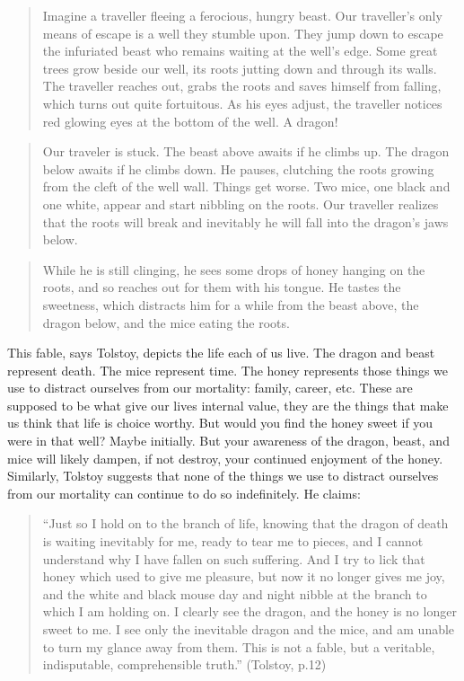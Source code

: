 \documentclass[9pt]{article}
\begin{document}
\begin{quote}
Imagine a traveller fleeing a ferocious, hungry beast. Our traveller's
only means of escape is a well they stumble upon. They jump down to
escape the infuriated beast who remains waiting at the well's edge. Some
great trees grow beside our well, its roots jutting down and through its
walls. The traveller reaches out, grabs the roots and saves himself from
falling, which turns out quite fortuitous. As his eyes adjust, the
traveller notices red glowing eyes at the bottom of the well. A dragon!
\end{quote}

\begin{quote}
Our traveler is stuck. The beast above awaits if he climbs up. The
dragon below awaits if he climbs down. He pauses, clutching the roots
growing from the cleft of the well wall. Things get worse. Two mice, one
black and one white, appear and start nibbling on the roots. Our
traveller realizes that the roots will break and inevitably he will fall
into the dragon's jaws below.
\end{quote}

\begin{quote}
While he is still clinging, he sees some drops of honey hanging on the
roots, and so reaches out for them with his tongue. He tastes the
sweetness, which distracts him for a while from the beast above, the
dragon below, and the mice eating the roots.
\end{quote}

This fable, says Tolstoy, depicts the life each of us live. The dragon
and beast represent death. The mice represent time. The honey represents
those things we use to distract ourselves from our mortality: family,
career, etc. These are supposed to be what give our lives internal
value, they are the things that make us think that life is choice
worthy. But would you find the honey sweet if you were in that well?
Maybe initially. But your awareness of the dragon, beast, and mice will
likely dampen, if not destroy, your continued enjoyment of the honey.
Similarly, Tolstoy suggests that none of the things we use to distract
ourselves from our mortality can continue to do so indefinitely. He
claims:

\begin{quote}
``Just so I hold on to the branch of life, knowing that the dragon of
death is waiting inevitably for me, ready to tear me to pieces, and I
cannot understand why I have fallen on such suffering. And I try to lick
that honey which used to give me pleasure, but now it no longer gives me
joy, and the white and black mouse day and night nibble at the branch to
which I am holding on. I clearly see the dragon, and the honey is no
longer sweet to me. I see only the inevitable dragon and the mice, and
am unable to turn my glance away from them. This is not a fable, but a
veritable, indisputable, comprehensible truth.'' (Tolstoy, p.12)
\end{quote}
\end{document}
